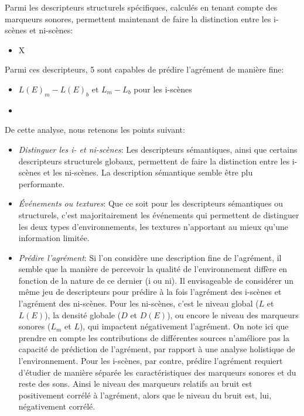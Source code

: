 Parmi les descripteurs structurels spécifiques, calculés en tenant compte des marqueurs sonores,   permettent maintenant de faire la distinction entre les i-scènes et ni-scènes:

\begin{itemize}
\item X
\end{itemize}

Parmi ces descripteurs, 5 sont capables de prédire l'agrément de manière fine: 

\begin{itemize}
\item $L(E)_m-L(E)_b$ et $L_m-L_b$ pour les i-scènes
\item 
\end{itemize}

De cette analyse, nous retenons les points suivant:

\begin{itemize}
\item \emph{Distinguer les i- et ni-scènes}: Les descripteurs sémantiques, ainsi que certains descripteurs structurels globaux, permettent de faire la distinction entre les i-scènes et les ni-scènes. La description sémantique semble être plu performante.
\item \emph{Événements ou textures}: Que ce soit pour les descripteurs sémantiques ou structurels, c'est majoritairement les événements qui permettent de distinguer les deux types d'environnements, les textures n'apportant au mieux qu'une information limitée.
\item \emph{Prédire l'agrément}: Si l'on considère une description fine de l'agrément, il semble que la manière de percevoir la qualité de l'environnement diffère en fonction de la nature de ce dernier (i ou ni). Il   envisageable de considérer un même jeu de descripteurs pour prédire à la fois l'agrément des i-scènes et l'agrément des ni-scènes. Pour les ni-scènes, c'est le niveau global ($L$ et $L(E)$), la densité globale ($D$ et $D(E)$), ou encore le niveau des marqueurs sonores ($L_m$ et $L$), qui impactent négativement l'agrément. On note ici que prendre en compte les contributions de différentes sources n'améliore pas la capacité de prédiction de l'agrément, par rapport à une analyse holistique de l'environnement. Pour les i-scènes, par contre, prédire l'agrément requiert d'étudier de manière séparée les caractéristiques des marqueurs sonores et du reste des sons. Ainsi le niveau des marqueurs relatifs au bruit est positivement corrélé à l'agrément, alors que le niveau du bruit est, lui, négativement corrélé.  
\end{itemize}

